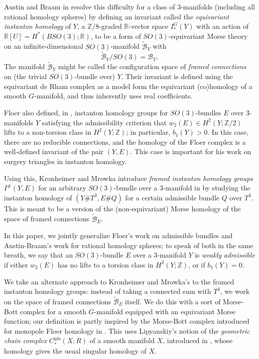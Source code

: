 \documentclass{memo-l}
\theoremstyle{definition}
\theoremstyle{remark}
\numberwithin{section}{chapter}
\numberwithin{equation}{chapter}
\begin{document}
Austin and Braam in \cite{AB} resolve this difficulty for a class of 3-manifolds (including all rational homology spheres) by defining an invariant called the \emph{equivariant instanton homology} of $Y$, a $\mathbb Z/8$-graded $\mathbb R$-vector space $I^G_*(Y)$ with an action of $\mathbb R[U] = H^*(BSO(3);\mathbb R)$, to be a form of $SO(3)$-equivariant Morse theory on an infinite-dimensional $SO(3)$-manifold $\widetilde{\mathcal B}_Y$ with $$\widetilde{\mathcal B}_Y/SO(3) = \mathcal B_Y.$$ The manifold $\widetilde{\mathcal B}_Y$ might be called the configuration space of \emph{framed connections} on (the trivial $SO(3)$-bundle over) $Y$. Their invariant is defined using the equivariant de Rham complex as a model form the equivariant (co)homology of a smooth $G$-manifold, and thus inherently uses real coefficients.

Floer also defined, in \cite{Fl2}, instanton homology groups for $SO(3)$-bundles $E$ over 3-manifolds $Y$ satisfying the admissibility criterion that $w_2(E) \in H^2(Y;\mathbb Z/2)$ lifts to a non-torsion class in $H^2(Y;\mathbb Z)$; in particular, $b_1(Y) > 0$. In this case, there are no reducible connections, and the homology of the Floer complex is a well-defined invariant of the pair $(Y,E)$. This case is important for his work on surgery triangles in instanton homology.

Using this, Kronheimer and Mrowka introduce \emph{framed instanton homology groups} $I^\#(Y,E)$ for an arbitrary $SO(3)$-bundle over a 3-manifold in \cite{KM1} by studying the instanton homology of $(Y \# T^3, E \# Q)$ for a certain admissible bundle $Q$ over $T^3$. This is meant to be a version of the (non-equivariant) Morse homology of the space of framed connections $\widetilde{\mathcal B}_E$.

In this paper, we jointly generalize Floer's work on admissible bundles and Austin-Braam's work for rational homology spheres; to speak of both in the same breath, we say that an $SO(3)$-bundle $E$ over a 3-manifold $Y$ is \textit{weakly admissible} if either $w_2(E)$ has no lifts to a torsion class in $H^2(Y;\mathbb Z)$, or if $b_1(Y) = 0$.

We take an alternate approach to Kronheimer and Mrowka's to the framed instanton homology groups: instead of taking a connected sum with $T^3$, we work on the space of framed connections $\widetilde{\mathcal B}_E$ itself. We do this with a sort of Morse-Bott complex for a smooth $G$-manifold equipped with an equivariant Morse function; our definition is partly inspired by the Morse-Bott complex introduced for monopole Floer homology in \cite{Lin}. This uses Lipyanskiy's notion of the \textit{geometric chain complex} $C_*^{\text{gm}}(X;R)$ of a smooth manifold $X$, introduced in \cite{Lip}, whose homology gives the usual singular homology of $X$.
\end{document}
